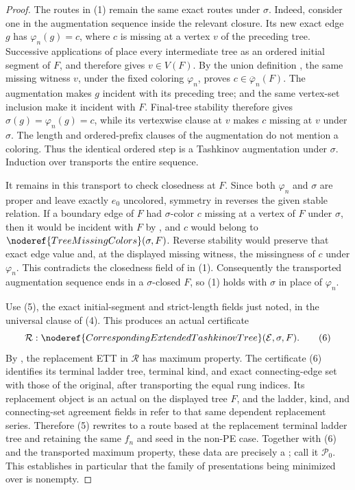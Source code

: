 \begin{proof}
The routes in (1) remain the same exact routes under \(\sigma\).  Indeed,
consider one  in the augmentation sequence
inside the relevant closure.  Its new exact edge \(g\) has
\(\varphi_n(g)=c\), where \(c\) is missing at a vertex \(v\) of the
preceding tree.  Successive applications of
 place every intermediate tree as an
ordered initial segment of \(F\), and 
therefore gives \(v\in V(F)\).  By the union definition
, the same missing witness \(v\), under the
fixed coloring \(\varphi_n\), proves
\(c\in\overline\varphi_n(F)\).  The augmentation makes \(g\) incident
with its preceding tree;  and the same
vertex-set inclusion make it incident with \(F\).  Final-tree stability
therefore gives \(\sigma(g)=\varphi_n(g)=c\), while its vertexwise clause
at \(v\) makes \(c\) missing at \(v\) under \(\sigma\).  The length and
ordered-prefix clauses of the augmentation do not mention a coloring.
Thus the identical ordered step is a Tashkinov augmentation under
\(\sigma\).  Induction over
 transports the entire sequence.

It remains in this transport to check closedness at \(F\).  Since both
\(\varphi_n\) and \(\sigma\) are proper and leave exactly \(e_0\)
uncolored, symmetry in  reverses the given stable relation.
If a boundary edge of \(F\) had \(\sigma\)-color \(c\) missing at a
vertex of \(F\) under \(\sigma\), then it would be incident with \(F\)
by , and \(c\) would belong to
\(\noderef{TreeMissingColors}(\sigma,F)\).  Reverse stability would
preserve that exact edge value and, at the displayed missing witness,
the missingness of \(c\) under \(\varphi_n\).  This contradicts the
closedness field of  in (1).  Consequently the
transported augmentation sequence ends in a \(\sigma\)-closed \(F\), so
(1) holds with \(\sigma\) in place of \(\varphi_n\).             \(\tag{5}\)

Use (5), the exact initial-segment and strict-length fields just noted,
in the universal clause of (4).  This produces an actual certificate
\[
 \mathcal R:
 \noderef{CorrespondingExtendedTashkinovTree}
       (\mathcal E,\sigma,F).                                  \tag{6}
\]
By , the replacement ETT in
\(\mathcal R\) has maximum property.  The certificate (6) identifies its
terminal ladder tree, terminal kind, and exact connecting-edge set with
those of the original, after transporting the equal rung indices.  Its
replacement object is an actual  on the
displayed tree \(F\), and the ladder, kind, and connecting-set agreement
fields in  refer to that same
dependent replacement series.  Therefore (5) rewrites to a route based
at the replacement terminal ladder tree and retaining the same \(f_n\)
and seed in the non-PE case.  Together with (6) and the transported
maximum property, these data are precisely a
; call it \(\mathcal P_0\).  This
establishes in particular that the family of presentations being
minimized over is nonempty.


\end{proof}
